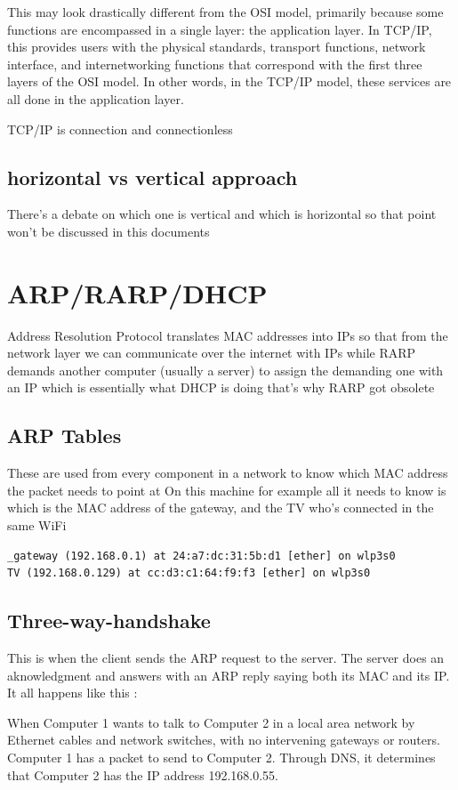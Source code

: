 \documentclass[a4paper,12pt]{article}
\begin{document}
This may look drastically different from the OSI model, primarily because some functions are encompassed in a single layer: the application layer. In TCP/IP, this provides users with the physical standards, transport functions, network interface, and internetworking functions that correspond with the first three layers of the OSI model. In other words, in the TCP/IP model, these services are all done in the application layer.

TCP/IP is connection and connectionless

\subsection{horizontal vs vertical approach}
There's a debate on which one is vertical and which is horizontal so that point won't be discussed in this documents

\section{ARP/RARP/DHCP}
Address Resolution Protocol translates MAC addresses into IPs so that from the network layer we can communicate over the internet with IPs while RARP demands another computer (usually a server) to assign the demanding one with an IP which is essentially what DHCP is doing that's why RARP got obsolete
\subsection{ARP Tables}
These are used from every component in a network to know which MAC address the packet needs to point at 
On this machine for example all it needs to know is which is the MAC address of the gateway, and the TV who's connected in the same WiFi

\begin{lstlisting}
_gateway (192.168.0.1) at 24:a7:dc:31:5b:d1 [ether] on wlp3s0
TV (192.168.0.129) at cc:d3:c1:64:f9:f3 [ether] on wlp3s0
\end{lstlisting}

\subsection{Three-way-handshake}
This is when the client sends the ARP request to the server. The server does an aknowledgment and answers with an ARP reply saying both its MAC and its IP. It all happens like this :

When Computer 1 wants to talk to  Computer 2 in a local area network by Ethernet cables and network switches, with no intervening gateways or routers. Computer 1 has a packet to send to Computer 2. Through DNS, it determines that Computer 2 has the IP address 192.168.0.55.
\end{document}
